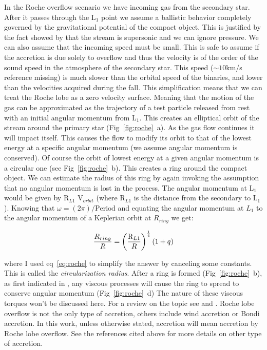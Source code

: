 In the Roche overflow scenario we have incoming gas from the secondary star. After it passes through the L$_1$ point we assume a ballistic behavior completely governed by the gravitational potential of the compact object. This is justified by the fact showed by \cite{lubow_gas_1975} that the stream is supersonic and we can ignore pressure. We can also assume that the incoming speed must be small. This is safe to assume if the accretion is due solely to overflow and thus the velocity is of the order of the sound speed in the atmosphere of the secondary star. This speed ($\sim 10 $km/s reference missing) is much slower than the orbital speed of the binaries,  and lower than the velocities acquired during the fall. This simplification means that we can treat the Roche lobe as a zero velocity surface. Meaning that the motion of the gas can be approximated as the trajectory of a test particle released from rest with an initial angular momentum from L$_1$. This creates an elliptical orbit of the stream around the primary star (Fig~\ref{fig:roche}~a). As the gas flow continues it will impact itself. This causes the flow to modify its orbit to that of the lowest energy at a specific angular momentum (we assume angular momentum is conserved). Of course the orbit of lowest energy at a given angular momentum is a circular one (see Fig~\ref{fig:roche}~b). This creates a ring around the compact object.  We can estimate the radius of this ring by again invoking the assumption that no angular momentum is lost in the process. The angular momentum at L$_1$ would be given by  R$_{L1}$  V$_{orbit}$ (where R$_{L1}$ is the distance from the secondary to L$_1$). Knowing that $\omega = (2 \pi)/\text{Period}$ and equating the angular momentum at $L_1$ to the angular momentum of a Keplerian orbit at $R_{ring}$ we get:


\begin{equation}
        \frac{R_{ring}}{R} = \left ( \frac{\text R _{L1}}{R} \right ) ^{\frac{1}{4}} (1+q)
\end{equation}

where I used eq~\ref{eq:roche} to simplify the answer by canceling some constants. This is called the \emph{circularization radius}. After a ring is formed (Fig~\ref{fig:roche}~b), as first indicated in \cite{lynden-bell_evolution_1974}, any viscous processes will cause the ring to spread to conserve angular momentum (Fig~\ref{fig:roche}~d) The nature of these viscous torques won't be discussed here. For a review on the topic see \cite{frank_accretion_2002} and \cite{verbunt_accretion_1982}. Roche lobe overflow is not the only type of accretion, others include wind accretion or Bondi accretion. In this work, unless otherwise stated, accretion will mean accretion by Roche lobe overflow. See the references cited above for more details on other type of accretion. \\


